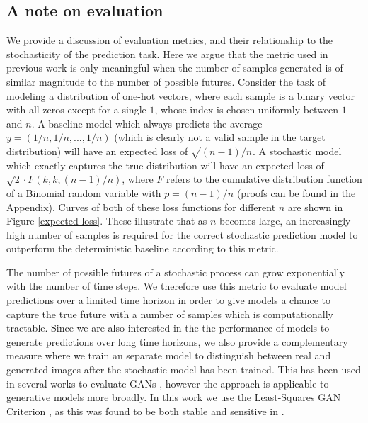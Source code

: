 \documentclass{article}
\begin{document}
\subsection{A note on evaluation}

We provide a discussion of evaluation metrics, and their relationship to the stochasticity of the prediction task.
Here we argue that the metric used in previous work \citep{Walker2016, Babaeizadeh2018, Denton2018} is only meaningful when the number of samples generated is of similar magnitude to the number of possible futures.
Consider the task of modeling a distribution of one-hot vectors, where each sample is a binary vector with all zeros except for a single $1$, whose index is chosen uniformly between $1$ and $n$.
A baseline model which always predicts the average $\tilde{y} = (1/n, 1/n, ..., 1/n)$ (which is clearly not a valid sample in the target distribution) will have an expected loss of $\sqrt{(n-1)/n}$. A stochastic model which exactly captures the true distribution will have an expected loss of $\sqrt{2} \cdot F(k, k, (n-1)/n)$, where $F$ refers to the cumulative distribution function of a Binomial random variable with $p=(n-1)/n$ (proofs can be found in the Appendix).
Curves of both of these loss functions for different $n$ are shown in Figure \ref{expected-loss}.
These illustrate that as $n$ becomes large, an increasingly high number of samples is required for the correct stochastic prediction model to outperform the deterministic baseline according to this metric.

The number of possible futures of a stochastic process can grow exponentially with the number of time steps.
We therefore use this metric to evaluate model predictions over a limited time horizon in order to give models a chance to capture the true future with a number of samples which is computationally tractable.
Since we are also interested in the the performance of models to generate predictions over long time horizons, we also provide a complementary measure where we train an separate model to distinguish between real and generated images after the stochastic model has been trained. This has been used in several works to evaluate GANs \citep{Danihelka17, Rosca17, GANeval}, however the approach is applicable to generative models more broadly. In this work we use the Least-Squares GAN Criterion \citep{Mao16}, as this was found to be both stable and sensitive in \citep{GANeval}.
\end{document}
